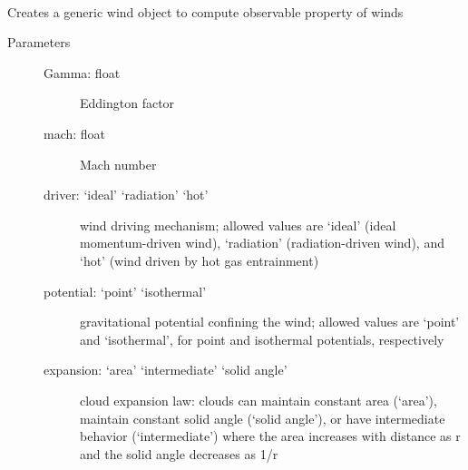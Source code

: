 \documentclass[letterpaper,10pt,english]{sphinxmanual}
\begin{document}
\begin{fulllineitems}
\label{fulldoc:despotic.winds.pwind}~

\begin{fulllineitems}
\label{fulldoc:despotic.winds.pwind.__init__}
Creates a generic wind object to compute observable property
of winds
\begin{description}
\item[{Parameters}] \leavevmode\begin{description}
\item[{Gamma: float}] \leavevmode
Eddington factor

\item[{mach: float}] \leavevmode
Mach number

\item[{driver: `ideal' \textbar{} `radiation' \textbar{} `hot'}] \leavevmode
wind driving mechanism; allowed values are `ideal'
(ideal momentum-driven wind), `radiation'
(radiation-driven wind), and `hot' (wind driven by hot
gas entrainment)

\item[{potential: `point' \textbar{} `isothermal'}] \leavevmode
gravitational potential confining the wind; allowed
values are `point' and `isothermal', for point and
isothermal potentials, respectively

\item[{expansion: `area' \textbar{} `intermediate' \textbar{} `solid angle'}] \leavevmode
cloud expansion law: clouds can maintain constant area
(`area'), maintain constant solid angle (`solid angle'),
or have intermediate behavior (`intermediate') where the
area increases with distance as r and the solid angle
decreases as 1/r


\end{description}
\end{description}
\end{fulllineitems}
\end{fulllineitems}
\end{document}
